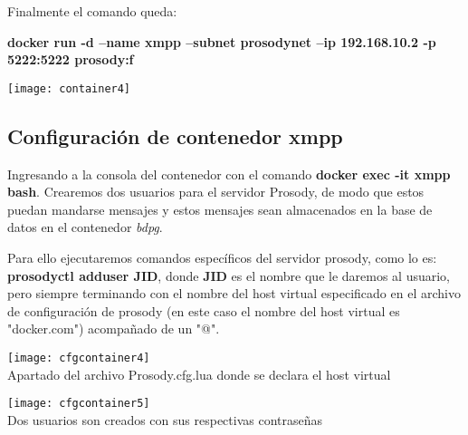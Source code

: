 \documentclass[10pt,letterpaper]{article}
\begin{document}
Finalmente el comando queda:

\textbf{docker run -d --name xmpp --subnet prosodynet --ip 192.168.10.2 -p 5222:5222 prosody:f}\\

\begin{center}
\texttt{[image: container4]}
\end{center}

\subsection{Configuración de contenedor xmpp}

Ingresando a la consola del contenedor con el comando \textbf{docker exec -it xmpp bash}. Crearemos dos usuarios para el servidor Prosody, de modo que estos puedan mandarse mensajes y estos mensajes sean almacenados en la base de datos en el contenedor \textit{bdpg}.

Para ello ejecutaremos comandos específicos del servidor prosody, como lo es: \textbf{prosodyctl adduser JID}, donde \textbf{JID} es el nombre que le daremos al usuario, pero siempre terminando con el nombre del host virtual  especificado en el archivo de configuración de prosody (en este caso el nombre del host virtual es "docker.com") acompañado de un "@".

\begin{center}
\texttt{[image: cfgcontainer4]}\\
Apartado del archivo Prosody.cfg.lua donde se declara el host virtual
\end{center}

\begin{center}
\texttt{[image: cfgcontainer5]}\\
Dos usuarios son creados con sus respectivas contraseñas
\end{center}
\end{document}
